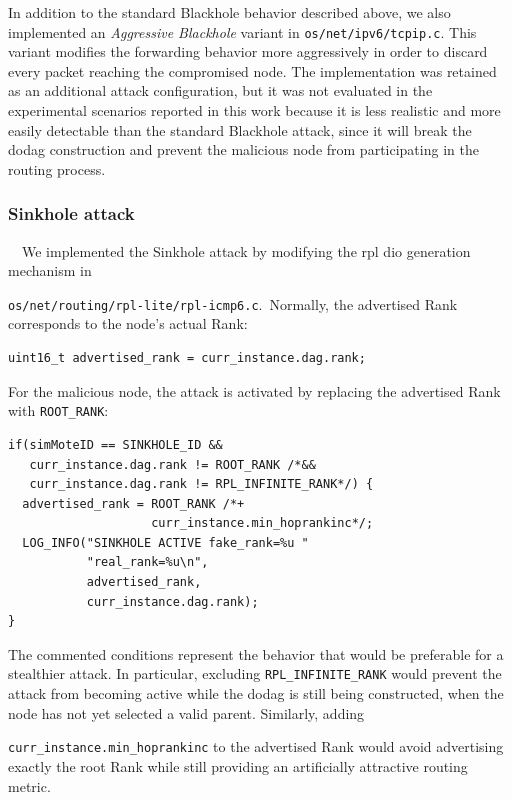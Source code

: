 In addition to the standard Blackhole behavior described above, we also implemented an \textit{Aggressive Blackhole} variant in \texttt{os/net/ipv6/tcpip.c}.
This variant modifies the forwarding behavior more aggressively in order to discard every packet reaching the compromised node.
The implementation was retained as an additional attack configuration, but it was not evaluated in the experimental scenarios reported in this work because it is less realistic and more easily detectable than the standard Blackhole attack, since it will break the \gls{dodag} construction and prevent the malicious node from participating in the routing process.

\subsubsection{Sinkhole attack}\
\label{subsubsec:sinkhole_implementation}\
We implemented the Sinkhole attack by modifying the \gls{rpl} \gls{dio} generation mechanism in

\texttt{os/net/routing/rpl-lite/rpl-icmp6.c}.\
Normally, the advertised Rank corresponds to the node's actual Rank:

\begin{verbatim}
uint16_t advertised_rank = curr_instance.dag.rank;
\end{verbatim}

For the malicious node, the attack is activated by replacing the advertised Rank with
\texttt{ROOT\_RANK}:

\begin{verbatim}
if(simMoteID == SINKHOLE_ID &&
   curr_instance.dag.rank != ROOT_RANK /*&&
   curr_instance.dag.rank != RPL_INFINITE_RANK*/) {
  advertised_rank = ROOT_RANK /*+
                    curr_instance.min_hoprankinc*/;
  LOG_INFO("SINKHOLE ACTIVE fake_rank=%u "
           "real_rank=%u\n",
           advertised_rank,
           curr_instance.dag.rank);
}
\end{verbatim}

The commented conditions represent the behavior that would be preferable for a stealthier attack.
In particular, excluding \texttt{RPL\_INFINITE\_RANK} would prevent the attack from becoming active while the \gls{dodag} is still being constructed, when the node has not yet selected a valid parent.
Similarly, adding

\texttt{curr\_instance.min\_hoprankinc} to the advertised Rank would avoid advertising exactly the root Rank while still providing an artificially attractive routing metric.

